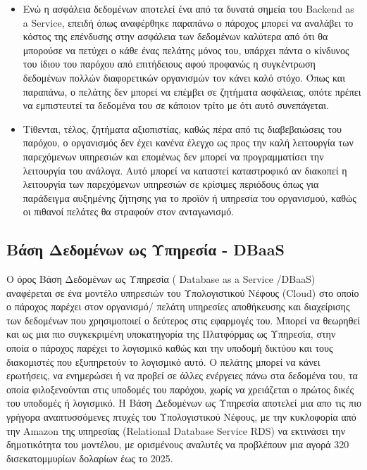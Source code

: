 \documentclass{article}
\begin{document}
\begin{itemize}
\item Ενώ η ασφάλεια δεδομένων αποτελεί ένα από τα δυνατά σημεία του Backend as a Service, επειδή όπως αναφέρθηκε παραπάνω ο πάροχος μπορεί να αναλάβει το κόστος της επένδυσης στην ασφάλεια των δεδομένων καλύτερα από ότι θα μπορούσε να πετύχει ο κάθε ένας πελάτης μόνος του, υπάρχει πάντα ο κίνδυνος του ίδιου του παρόχου από επιτήδειους αφού προφανώς η συγκέντρωση δεδομένων πολλών διαφορετικών οργανισμών τον κάνει καλό στόχο. Όπως και παραπάνω, ο πελάτης δεν μπορεί να επέμβει σε ζητήματα ασφάλειας, οπότε πρέπει να εμπιστευτεί τα δεδομένα του σε κάποιον τρίτο με ότι αυτό συνεπάγεται.
\item Τίθενται, τέλος, ζητήματα αξιοπιστίας, καθώς πέρα από τις διαβεβαιώσεις του παρόχου, ο οργανισμός δεν έχει κανένα έλεγχο ως προς την καλή λειτουργία των παρεχόμενων υπηρεσιών και επομένως δεν μπορεί να προγραμματίσει την λειτουργία του ανάλογα. Αυτό μπορεί να καταστεί καταστροφικό αν διακοπεί η λειτουργία των παρεχόμενων υπηρεσιών σε κρίσιμες περιόδους όπως για παράδειγμα αυξημένης ζήτησης για το προϊόν ή υπηρεσία του οργανισμού, καθώς οι πιθανοί πελάτες θα στραφούν στον ανταγωνισμό.
\end{itemize}


\subsection{Βάση Δεδομένων ως Υπηρεσία - DBaaS}
Ο όρος Βάση Δεδομένων ως Υπηρεσία ( Database as a Service /DBaaS) αναφέρεται σε ένα μοντέλο υπηρεσιών του Υπολογιστικού Νέφους (Cloud) στο οποίο ο πάροχος παρέχει στον οργανισμό/ πελάτη υπηρεσίες αποθήκευσης και διαχείρισης των δεδομένων που χρησιμοποιεί ο δεύτερος στις εφαρμογές του. Μπορεί να θεωρηθεί και ως μια πιο συγκεκριμένη υποκατηγορία της Πλατφόρμας ως Υπηρεσία, στην οποία ο πάροχος παρέχει το λογισμικό καθώς και την υποδομή δικτύου και τους διακομιστές που εξυπηρετούν το λογισμικό αυτό. Ο πελάτης μπορεί να κάνει ερωτήσεις, να ενημερώσει ή να προβεί σε άλλες ενέργειες πάνω στα δεδομένα του, τα οποία φιλοξενούνται στις υποδομές του παρόχου, χωρίς να χρειάζεται ο πρώτος δικές του υποδομές ή λογισμικό. Η Βάση Δεδομένων ως Υπηρεσία αποτελεί μια απο τις πιο γρήγορα αναπτυσσόμενες πτυχές του Υπολογιστικού Νέφους, με την κυκλοφορία από την Amazon της υπηρεσίας (Relational Database Service RDS) να εκτινάσει την δημοτικότητα του μοντέλου, με ορισμένους αναλυτές να προβλέπουν μια αγορά 320 δισεκατομμυρίων δολαρίων έως το 2025.
\end{document}
